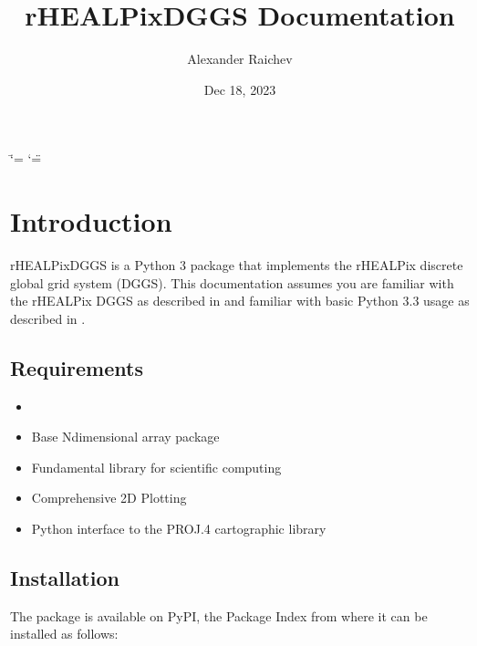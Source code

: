 \documentclass[a4paper,12ptopenany,oneside,english]{sphinxmanual}
\title{rHEALPixDGGS Documentation}
\date{Dec 18, 2023}
\author{Alexander Raichev}
\begin{document}
\ifdefined\shorthandoff
  \ifnum\catcode`\=\string=\active\shorthandoff{=}\fi
  \ifnum\catcode`\"=\active{}\fi
\fi

\pagestyle{empty}
\sphinxmaketitle
\pagestyle{plain}
\sphinxtableofcontents
\pagestyle{normal}
\label{\detokenize{index::doc}}


\sphinxstepscope


\chapter{Introduction}
\label{\detokenize{introduction:introduction}}\label{\detokenize{introduction::doc}}
\sphinxAtStartPar
rHEALPixDGGS is a Python 3 package that implements the rHEALPix discrete global grid system (DGGS).
This documentation assumes you are familiar with the rHEALPix DGGS as described in  and familiar with basic Python 3.3 usage as described in .


\section{Requirements}
\label{\detokenize{introduction:requirements}}\begin{itemize}
\item {} 
\sphinxAtStartPar
{}

\item {} 
\sphinxAtStartPar
{} Base N\sphinxhyphen{}dimensional array package

\item {} 
\sphinxAtStartPar
{} Fundamental library for scientific computing

\item {} 
\sphinxAtStartPar
{} Comprehensive 2D Plotting

\item {} 
\sphinxAtStartPar
{}
Python interface to the PROJ.4 cartographic library

\end{itemize}


\section{Installation}
\label{\detokenize{introduction:installation}}
\sphinxAtStartPar
The package is available on PyPI, the Package Index from where it can be installed as follows:
\end{document}
